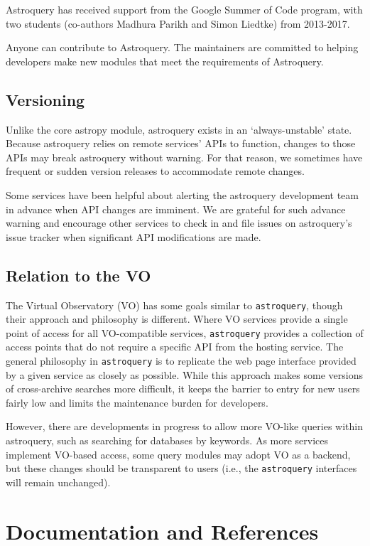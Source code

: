 \documentclass[twocolumn]{aastex61}
\newcommand{\package}[1]{\texttt{#1}\xspace}
\newcommand{\astroquery}{\package{astroquery}}
\begin{document}
Astroquery has received support from the Google Summer of Code
program, with two students (co-authors Madhura Parikh and Simon Liedtke)
from 2013-2017.

Anyone can contribute to Astroquery.  The maintainers are committed to helping
developers make new modules that meet the requirements of Astroquery.

\subsection{Versioning}
Unlike the core astropy module, astroquery exists in an `always-unstable' state.
Because astroquery relies on remote services' APIs to function, changes to those
APIs may break astroquery without warning.  For that reason, we sometimes have
frequent or sudden version releases to accommodate remote changes.

Some services have been helpful about alerting the astroquery development team
in advance when API changes are imminent.  We are grateful for such advance
warning and encourage other services to check in and file issues on astroquery's
issue tracker when significant API modifications are made.

\subsection{Relation to the VO}

The Virtual Observatory (VO) has some goals similar to \astroquery,
though their approach and philosophy is different.  Where VO services provide a
single point of access for all VO-compatible services, \astroquery
provides a collection of access points that do not require a specific API from
the hosting service.  The general philosophy in \astroquery is to
replicate the web page interface provided by a given service as closely as
possible.  While this approach makes some versions of cross-archive searches
more difficult, it keeps the barrier to entry for new users fairly low and limits
the maintenance burden for developers.

However, there are developments in progress to allow more VO-like queries
within astroquery, such as searching for databases by keywords.  As more
services implement VO-based access, some query modules may adopt VO as a backend,
but these changes should be transparent to users (i.e., the \astroquery
interfaces will remain unchanged).

\section{Documentation and References}
\end{document}
